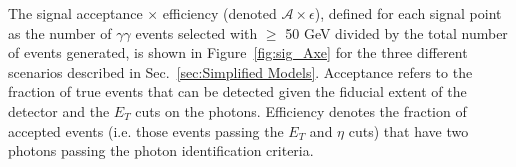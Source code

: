 \documentclass[dissertation.tex]{subfiles}
\begin{document}
The signal acceptance $\times$ efficiency (denoted $\mathcal{A}\times\epsilon$), defined for each signal point as the number of $\gamma\gamma$ events selected with \MET $\geq$ 50 GeV divided by the total number of events generated, is shown in Figure~\ref{fig:sig_Axe} for the three different scenarios described in Sec.~\ref{sec:Simplified Models}.  Acceptance refers to the fraction of true events that can be detected given the fiducial extent of the detector and the $E_{T}$ cuts on the photons.  Efficiency denotes the fraction of accepted events (i.e. those events passing the $E_{T}$ and $\eta$ cuts) that have two photons passing the photon identification criteria.

\begin{figure}
	\centering
	\hspace{1cm}

\end{figure}
\end{document}
